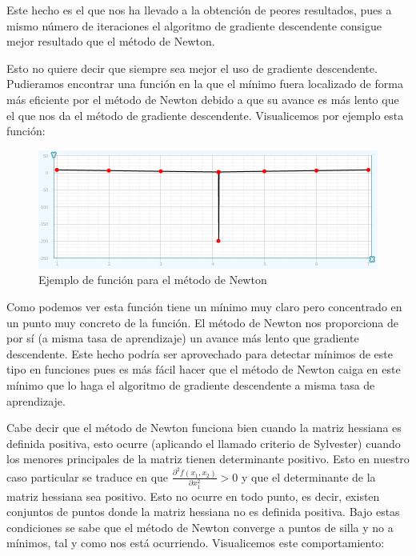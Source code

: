 \documentclass[12pt,a4paper]{article}
\begin{document}
Este hecho es el que nos ha llevado a la obtención de peores resultados, pues a mismo número de iteraciones el algoritmo de gradiente descendente consigue mejor resultado que el método de Newton.

Esto no quiere decir que siempre sea mejor el uso de gradiente descendente. Pudieramos encontrar una función en la que el mínimo fuera localizado de forma más eficiente por el método de Newton debido a que su avance es más lento que el que nos da el método de gradiente descendente. Visualicemos por ejemplo esta función:

\begin{figure}[H]
	\centering
	\includegraphics[scale=0.5]{./Imagenes/bonus5.png}
	\caption{Ejemplo de función para el método de Newton}
	\label{bonus5}
\end{figure}

Como podemos ver esta función tiene un mínimo muy claro pero concentrado en un punto muy concreto de la función. El método de Newton nos proporciona de por sí (a misma tasa de aprendizaje) un avance más lento que gradiente descendente. Este hecho podría ser aprovechado para detectar mínimos de este tipo en funciones pues es más fácil hacer que el método de Newton caiga en este mínimo que lo haga el algoritmo de gradiente descendente a misma tasa de aprendizaje.

Cabe decir que el método de Newton funciona bien cuando la matriz hessiana es definida positiva, esto ocurre (aplicando el llamado criterio de Sylvester) cuando los menores principales de la matriz tienen determinante positivo. Esto en nuestro caso particular se traduce en que $\frac{\partial^2 f(x_1,x_2)}{\partial x_{1}^{2}}>0$ y que el determinante de la matriz hessiana sea positivo. Esto no ocurre en todo punto, es decir, existen conjuntos de puntos donde la matriz hessiana no es definida positiva. Bajo estas condiciones se sabe que el método de Newton converge a puntos de silla y no a mínimos, tal y como nos está ocurriendo. Visualicemos este comportamiento:
\end{document}
